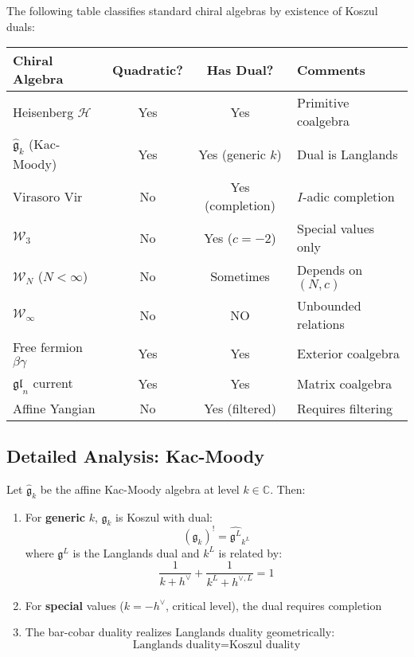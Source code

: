 \begin{theorem}\label{thm:classification-table}
The following table classifies standard chiral algebras by existence of Koszul duals:

\begin{center}
\small
\begin{tabular}{|l|c|c|l|}
\hline
\textbf{Chiral Algebra} & \textbf{Quadratic?} & \textbf{Has Dual?} & \textbf{Comments} \\
\hline
Heisenberg $\mathcal{H}$ & Yes & Yes & Primitive coalgebra \\
\hline
$\widehat{\mathfrak{g}}_k$ (Kac-Moody) & Yes & Yes (generic $k$) & Dual is Langlands \\
\hline
Virasoro $\text{Vir}$ & No & Yes (completion) & $I$-adic completion \\
\hline
$\mathcal{W}_3$ & No & Yes ($c = -2$) & Special values only \\
\hline
$\mathcal{W}_N$ ($N < \infty$) & No & Sometimes & Depends on $(N, c)$ \\
\hline
$\mathcal{W}_\infty$ & No & NO & Unbounded relations \\
\hline
Free fermion $\beta\gamma$ & Yes & Yes & Exterior coalgebra \\
\hline
$\mathfrak{gl}_n$ current & Yes & Yes & Matrix coalgebra \\
\hline
Affine Yangian & No & Yes (filtered) & Requires filtering \\
\hline
\end{tabular}
\end{center}
\end{theorem}

\subsection{Detailed Analysis: Kac-Moody}

\begin{proposition}\label{prop:kac-moody-koszul-duals}
Let $\widehat{\mathfrak{g}}_k$ be the affine Kac-Moody algebra at level $k \in \mathbb{C}$. 
Then:
\begin{enumerate}
\item For \textbf{generic} $k$, $\widehat{\mathfrak{g}}_k$ is Koszul with dual:
      $$(\widehat{\mathfrak{g}}_k)^! = \widehat{\mathfrak{g}^L}_{k^L}$$
      where $\mathfrak{g}^L$ is the Langlands dual and $k^L$ is related by:
      $$\frac{1}{k + h^\vee} + \frac{1}{k^L + h^{\vee,L}} = 1$$
      
\item For \textbf{special} values ($k = -h^\vee$, critical level), the dual requires 
      completion
      
\item The bar-cobar duality realizes Langlands duality geometrically:
      $$\text{Langlands duality} = \text{Koszul duality}$$
\end{enumerate}
\end{proposition}

